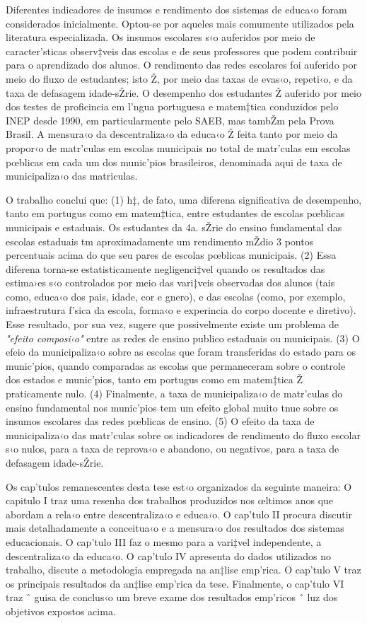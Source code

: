 \documentclass[a4paper, 12pt]{article}
\begin{document}
Diferentes indicadores de insumos e rendimento dos sistemas de educa‹o foram considerados inicialmente. Optou-se por aqueles mais comumente utilizados pela literatura especializada. Os insumos escolares s‹o auferidos por meio de caracter’sticas observ‡veis das escolas e de seus professores que podem contribuir para o aprendizado dos alunos. O rendimento das redes escolares foi auferido por meio do fluxo de estudantes; isto Ž, por meio das taxas de evas‹o, repeti‹o, e  da taxa de defasagem idade-sŽrie. O desempenho dos estudantes Ž auferido por meio dos testes de proficincia em l’ngua portuguesa e matem‡tica conduzidos pelo INEP desde 1990, em particularmente pelo SAEB, mas tambŽm pela Prova Brasil.  A mensura‹o da descentraliza‹o da educa‹o Ž feita tanto por meio da propor‹o de matr’culas em escolas municipais no total de matr’culas em escolas pœblicas em cada um dos munic’pios brasileiros, denominada aqui de taxa de municipaliza‹o das matriculas. 

O trabalho conclui que: (1) h‡, de fato, uma diferena significativa de desempenho, tanto em portugus como em matem‡tica, entre estudantes de escolas pœblicas municipais e estaduais. Os estudantes da 4a. sŽrie do ensino fundamental das escolas estaduais tm aproximadamente um rendimento mŽdio 3 pontos percentuais acima do que seu pares de escolas pœblicas municipais. (2) Essa diferena torna-se estatisticamente negligenci‡vel quando os resultados das estima›es s‹o controlados por meio das vari‡veis observadas dos alunos (tais como, educa‹o dos pais, idade, cor e gnero), e das escolas (como, por exemplo, infraestrutura f’sica da escola, forma‹o e experincia do corpo docente e diretivo). Esse resultado, por sua vez, sugere que possivelmente existe um problema de \emph{"efeito composi‹o"} entre as redes de ensino publico estaduais ou municipais. (3) O efeio da municipaliza‹o sobre as escolas que foram transferidas do estado para os munic’pios, quando comparadas as escolas que permaneceram sobre o controle dos estados e munic’pios, tanto em portugus como em matem‡tica Ž praticamente nulo. (4) Finalmente, a taxa de municipaliza‹o de matr’culas do ensino fundamental nos munic’pios tem um efeito global muito tnue sobre os insumos escolares das redes pœblicas de ensino. (5) O efeito da taxa de municipaliza‹o das matr’culas sobre os indicadores de rendimento do fluxo escolar s‹o nulos, para a taxa de reprova‹o e abandono, ou negativos, para a taxa de defasagem idade-sŽrie.  

Os cap’tulos remanescentes desta tese est‹o organizados da seguinte maneira: O capitulo I traz uma resenha dos trabalhos produzidos nos œltimos anos que abordam a rela‹o entre descentraliza‹o e educa‹o. O cap’tulo II procura discutir mais detalhadamente a conceitua‹o e a mensura‹o dos resultados dos sistemas educacionais. O cap’tulo III faz o mesmo para a vari‡vel independente, a descentraliza‹o da educa‹o. O cap’tulo IV apresenta do dados utilizados no trabalho, discute a metodologia empregada na an‡lise emp’rica. O cap’tulo V traz os principais resultados da an‡lise emp’rica da tese. Finalmente, o cap’tulo VI traz ˆ guisa de conclus‹o um breve exame dos resultados emp’ricos ˆ luz dos objetivos expostos acima. 
\end{document}
